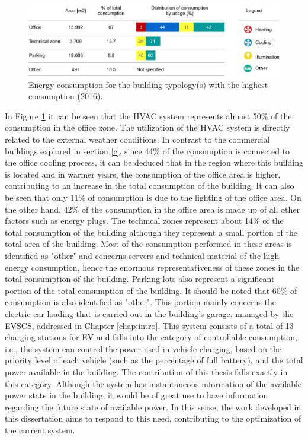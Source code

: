\begin{figure}[h!]
    \centering
    \begin{center}
    \includegraphics[width=1\textwidth]{Images/ConsumoEDP.png}
    \caption{Energy consumption for the building typology(s) with the highest consumption (2016).}
    \label{consedp}
    \end{center}
\end{figure}
In Figure \ref{consedp} it can be seen that the \ac{HVAC} system represents almost 50\% of the consumption in the office zone. The utilization of the \ac{HVAC} system is directly related to the external weather conditions. In contrast to the commercial buildings explored in section \ref{c}, since 44\% of the consumption is connected to the office cooling process, it can be deduced that in the region where this building is located and in warmer years, the consumption of the office area is higher, contributing to an increase in the total consumption of the building. It can also be seen that only 11\% of consumption is due to the lighting of the office area. On the other hand, 42\% of the consumption in the office area is made up of all other factors such as energy plugs. The technical zones represent about 14\% of the total consumption of the building although they represent a small portion of the total area of the building. Most of the consumption performed in these areas is identified as "other" and concerns servers and technical material of the high energy consumption, hence the enormous representativeness of these zones in the total consumption of the building. Parking lots also represent a significant portion of the total consumption of the building. It should be noted that 60\% of consumption is also identified as "other". This portion mainly concerns the electric car loading that is carried out in the building's garage, managed by the \ac{EVSCS}, addressed in Chapter \ref{chap:intro}. This system consists of a total of 13 charging stations for \ac{EV} and falls into the category of controllable consumption, i.e., the system can control the power used in vehicle charging, based on the priority level of each vehicle (such as the percentage of full battery), and the total power available in the building. The contribution of this thesis falls exactly in this category. Although the system has instantaneous information of the available power state in the building, it would be of great use to have information regarding the future state of available power. In this sense, the work developed in this dissertation aims to respond to this need, contributing to the optimization of the current system.


